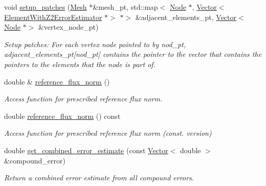 \begin{DoxyCompactItemize}
void \hyperlink{classoomph_1_1Z2ErrorEstimator_a7d00059cd1a8d61bbfc59788b1d12905}{setup\+\_\+patches} (\hyperlink{classoomph_1_1Mesh}{Mesh} $\ast$\&mesh\+\_\+pt, std\+::map$<$ \hyperlink{classoomph_1_1Node}{Node} $\ast$, \hyperlink{classoomph_1_1Vector}{Vector}$<$ \hyperlink{classoomph_1_1ElementWithZ2ErrorEstimator}{Element\+With\+Z2\+Error\+Estimator} $\ast$$>$ $\ast$$>$ \&adjacent\+\_\+elements\+\_\+pt, \hyperlink{classoomph_1_1Vector}{Vector}$<$ \hyperlink{classoomph_1_1Node}{Node} $\ast$$>$ \&vertex\+\_\+node\+\_\+pt)
\begin{DoxyCompactList}\small\item\em Setup patches\+: For each vertex node pointed to by nod\+\_\+pt, adjacent\+\_\+elements\+\_\+pt\mbox{[}nod\+\_\+pt\mbox{]} contains the pointer to the vector that contains the pointers to the elements that the node is part of. \end{DoxyCompactList}\item 
double \& \hyperlink{classoomph_1_1Z2ErrorEstimator_a997dc6ba0b546a0f7363949a8d33d133}{reference\+\_\+flux\+\_\+norm} ()
\begin{DoxyCompactList}\small\item\em Access function for prescribed reference flux norm. \end{DoxyCompactList}\item 
double \hyperlink{classoomph_1_1Z2ErrorEstimator_a4a7902d3e80dc64406e1f367c02ec4e3}{reference\+\_\+flux\+\_\+norm} () const
\begin{DoxyCompactList}\small\item\em Access function for prescribed reference flux norm (const. version) \end{DoxyCompactList}\item 
double \hyperlink{classoomph_1_1Z2ErrorEstimator_a53d7a1ac66dd41b39d6794e1d00080fc}{get\+\_\+combined\+\_\+error\+\_\+estimate} (const \hyperlink{classoomph_1_1Vector}{Vector}$<$ double $>$ \&compound\+\_\+error)
\begin{DoxyCompactList}\small\item\em Return a combined error estimate from all compound errors. \end{DoxyCompactList}\end{DoxyCompactItemize}
